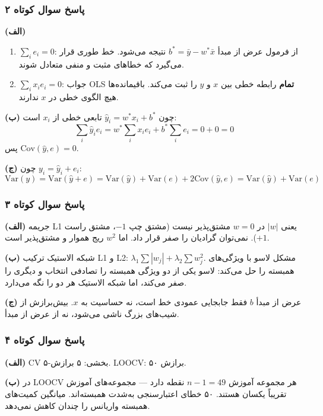 \documentclass[12pt,a4paper]{article}
\begin{document}
\bigskip

\subsubsection*{پاسخ سوال کوتاه ۲}

\textbf{(الف)}
\begin{enumerate}
\item $\sum_i e_i = 0$: از فرمول عرض از مبدأ $b^* = \bar{y} - w^*\bar{x}$ نتیجه می‌شود. خط طوری قرار می‌گیرد که خطاهای مثبت و منفی متعادل شوند.
\item $\sum_i x_i e_i = 0$: جواب OLS \textbf{تمام} رابطه خطی بین $x$ و $y$ را ثبت می‌کند. باقیمانده‌ها هیچ الگوی خطی در $x$ ندارند.
\end{enumerate}

\textbf{(ب)} چون $\hat{y}_i = w^*x_i + b^*$ تابعی خطی از $x_i$ است:
$$\sum_i \hat{y}_i e_i = w^* \sum_i x_i e_i + b^* \sum_i e_i = 0 + 0 = 0$$
پس $\text{Cov}(\hat{y}, e) = 0$.

\textbf{(ج)} چون $y_i = \hat{y}_i + e_i$:
$$\text{Var}(y) = \text{Var}(\hat{y} + e) = \text{Var}(\hat{y}) + \text{Var}(e) + 2\text{Cov}(\hat{y}, e) = \text{Var}(\hat{y}) + \text{Var}(e)$$

\bigskip

\subsubsection*{پاسخ سوال کوتاه ۳}

\textbf{(الف)} جریمه L1 یعنی $|w|$ در $w = 0$ مشتق‌پذیر نیست (مشتق چپ $-1$، مشتق راست $+1$). نمی‌توان گرادیان را صفر قرار داد. اما $w^2$ ریج هموار و مشتق‌پذیر است.

\textbf{(ب)} شبکه الاستیک ترکیب L1 و L2: $\lambda_1\sum|w_j| + \lambda_2\sum w_j^2$. مشکل لاسو با ویژگی‌های همبسته را حل می‌کند: لاسو یکی از دو ویژگی همبسته را تصادفی انتخاب و دیگری را صفر می‌کند، اما شبکه الاستیک هر دو را نگه می‌دارد.

\textbf{(ج)} عرض از مبدأ $b$ فقط جابجایی عمودی خط است، نه حساسیت به $x$. بیش‌برازش از شیب‌های بزرگ ناشی می‌شود، نه از عرض از مبدأ.

\bigskip

\subsubsection*{پاسخ سوال کوتاه ۴}

\textbf{(الف)} CV ۵-بخشی: ۵ برازش. LOOCV: ۵۰ برازش.

\textbf{(ب)} در LOOCV هر مجموعه آموزش $n-1 = 49$ نقطه دارد — مجموعه‌های آموزش تقریباً یکسان هستند. ۵۰ خطای اعتبارسنجی به‌شدت همبسته‌اند. میانگین کمیت‌های همبسته واریانس را چندان کاهش نمی‌دهد.
\end{document}
